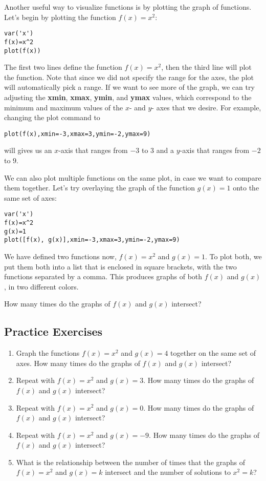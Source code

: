 Another useful way to visualize functions is by plotting the graph of
functions. Let's begin by plotting the function $f(x)=x^2$:

\begin{verbatim}
var('x')
f(x)=x^2
plot(f(x))
\end{verbatim}

The first two lines define the function $f(x)=x^2$, then the third line will plot
the function. Note that since we did not specify the range for the axes, the
plot will automatically pick a range. If we want to see more of the graph, we
can try adjusting the \textbf{xmin}, \textbf{xmax}, \textbf{ymin}, and \textbf{ymax}
values, which correspond to the minimum and maximum values of the
$x$- and $y$- axes that we desire. For example, changing the plot
command to

\begin{verbatim}
plot(f(x),xmin=-3,xmax=3,ymin=-2,ymax=9)
\end{verbatim}

will gives us an $x$-axis that ranges from $-3$ to $3$ and a $y$-axis that
ranges from $-2$ to $9$.

We can also plot multiple functions on the same plot, in case we
want to compare them together. Let's try overlaying the graph of
the function $g(x)=1$ onto the same set of axes:

\begin{verbatim}
var('x')
f(x)=x^2
g(x)=1
plot([f(x), g(x)],xmin=-3,xmax=3,ymin=-2,ymax=9)
\end{verbatim}

We have defined two functions now, $f(x)=x^2$ and $g(x)=1$. To
plot both, we put them both into a list that is enclosed in square
brackets, with the two functions separated by a comma. This produces
graphs of both $f(x)$ and $g(x)$, in two different colors.

How many times do the graphs of $f(x)$ and $g(x)$ intersect?

\subsection{Practice Exercises}

\begin{enumerate}
	\item Graph the functions $f(x)=x^2$ and $g(x)=4$ together
		on the same set of axes. How many times do the
		graphs of $f(x)$ and $g(x)$ intersect?
	\item Repeat with $f(x)=x^2$ and $g(x)=3$. How many times do the
		graphs of $f(x)$ and $g(x)$ intersect?
	\item Repeat with $f(x)=x^2$ and $g(x)=0$. How many times do the
		graphs of $f(x)$ and $g(x)$ intersect?
	\item Repeat with $f(x)=x^2$ and $g(x)=-9$. How many times do the
		graphs of $f(x)$ and $g(x)$ intersect?
	\item What is the relationship between the number of times
		that the graphs of $f(x)=x^2$ and $g(x)=k$ intersect and the
		number of solutions to $x^2=k$?
\end{enumerate}

